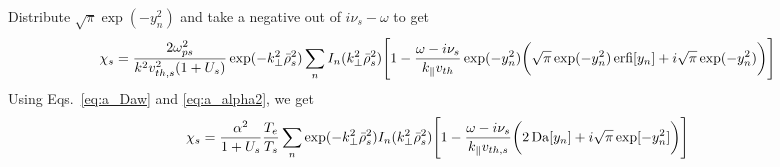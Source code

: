 Distribute $\sqrt{\pi}\exp(-y_n^2)$ and take a negative out of $i\nu_s-\omega$ to get
\begin{equation}
	\chi_s = \frac{2 \omega_{ps}^2}{k^2 v_{th,s}^2 (1+U_s)}
		\exp(-k_\perp^2 \bar{\rho}_s^2)
	\sum_n I_n (k_\perp^2 \bar{\rho}_s^2)
	\Bigg[
	1 - \frac{\omega - i \nu_s}{k_\parallel v_{th}}
	\exp(-y_n^2)
	\bigg( 	\sqrt{\pi} \exp(-y_n^2)\operatorname{erfi}[y_n] + i\sqrt{\pi} \exp(-y_n^2)\bigg)
	\Bigg]
\end{equation}
Using Eqs.~\ref{eq:a_Daw} and \ref{eq:a_alpha2}, we get
\begin{equation}
	\chi_s = \frac{\alpha^2}{1+U_s} \frac{T_e}{T_s}
	\sum_n \exp(-k_\perp^2 \bar{\rho}_s^2)
	I_n (k_\perp^2 \bar{\rho}_s^2)
	\Bigg[
	1 - \frac{\omega -i\nu_s}{k_\parallel v_{th,s}}
	\bigg(
	2 \operatorname{Da}[y_n] + i \sqrt{\pi} \exp[-y_n^2]
	\bigg)
	\Bigg]
\end{equation}











